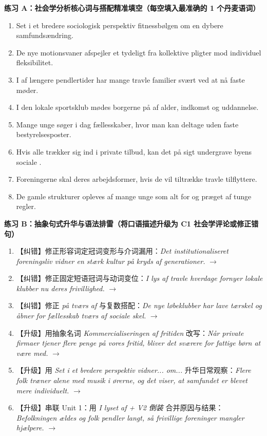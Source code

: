 \textbf{练习 A：社会学分析核心词与搭配精准填空（每空填入最准确的 1 个丹麦语词）}
\begin{enumerate}
  \item Set i et bredere sociologisk perspektiv \underline{\hspace{2.2cm}} fitnessbølgen om en dybere samfundsændring.
  \item De nye motionsvaner afspejler et tydeligt \underline{\hspace{2.2cm}} fra kollektive pligter mod individuel fleksibilitet.
  \item I \underline{\hspace{2.2cm}} af længere pendlertider har mange travle familier svært ved at nå faste møder.
  \item I den lokale sportsklub mødes borgerne på \underline{\hspace{2.2cm}} af alder, indkomst og uddannelse.
  \item Mange unge søger i dag \underline{\hspace{2.2cm}} fællesskaber, hvor man kan deltage uden faste bestyrelsesposter.
  \item Hvis alle trækker sig ind i private tilbud, kan det på sigt undergrave byens sociale \underline{\hspace{2.2cm}}.
  \item Foreningerne skal \underline{\hspace{2.2cm}} deres arbejdsformer, hvis de vil tiltrække travle tilflyttere.
  \item De gamle strukturer opleves af mange unge som alt for \underline{\hspace{2.2cm}} og præget af tunge regler.
\end{enumerate}

\textbf{练习 B：抽象句式升华与语法排雷（将口语描述升级为 C1 社会学评论或修正错句）}
\begin{enumerate}
  \item 【纠错】修正形容词定冠词变形与介词漏用：\textit{Det institutionaliseret foreningsliv vidner en stærk kultur på kryds af generationer.} $\rightarrow$
  \item 【纠错】修正固定短语冠词与动词变位：\textit{I lys af travle hverdage fornyer lokale klubber nu deres frivillighed.} $\rightarrow$
  \item 【纠错】修正 \textit{på tværs af} 与复数搭配：\textit{De nye løbeklubber har lave tærskel og åbner for fællesskab tværs af sociale skel.} $\rightarrow$
  \item 【升级】用抽象名词 \textit{Kommercialiseringen af fritiden} 改写：\textit{Når private firmaer tjener flere penge på vores fritid, bliver det sværere for fattige børn at være med.} $\rightarrow$
  \item 【升级】用 \textit{Set i et bredere perspektiv vidner... om...} 升华日常观察：\textit{Flere folk træner alene med musik i ørerne, og det viser, at samfundet er blevet mere individuelt.} $\rightarrow$
  \item 【升级】串联 Unit 1：用 \textit{I lyset af + V2 倒装} 合并原因与结果：\textit{Befolkningen ældes og folk pendler langt, så frivillige foreninger mangler hjælpere.} $\rightarrow$
\end{enumerate}

